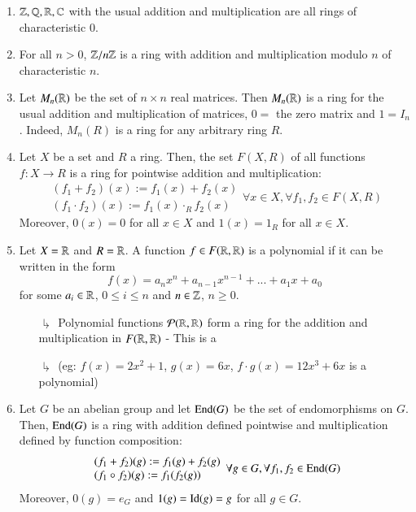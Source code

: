 \documentclass[12pt, a4paper, oneside, openright, titlepage]{book}
\begin{document}
\begin{eg}
    \leavevmode
    \begin{enumerate}
        \item $\mathbb Z, \mathbb Q, \mathbb R, \mathbb C$ with the usual addition and multiplication are all rings of characteristic $0$.
        \item For all $n > 0$, $\mathbb Z/n\mathbb Z$ is a ring with addition and multiplication modulo $n$ of characteristic $n$.
        \item Let $M_n(\mathbb R)$ be the set of $n\times n$ real matrices. Then $M_n(\mathbb R)$ is a ring for the usual addition and multiplication of matrices, $0 = $ the zero matrix and $1 = I_n$. Indeed, $M_n(R)$ is a ring for any arbitrary ring $R$.
        \item Let $X$ be a set and $R$ a ring. Then, the set $F(X,R)$ of all functions $f:X\rightarrow R$ is a ring for pointwise addition and multiplication: \begin{equation}
            \begin{array}{l} (f_1+f_2)(x) := f_1(x)+f_2(x) \\ (f_1\cdot f_2)(x) := f_1(x)\cdot_R f_2(x) \end{array} \forall x \in X, \forall f_1,f_2 \in F(X,R)
        \end{equation}
        Moreover, $0(x) = 0$ for all $x \in X$ and $1(x) = 1_R$ for all $x \in X$.
        \item Let $X = \mathbb R$ and $R = \mathbb R$. A function $f \in F(\mathbb R,\mathbb R)$ is a polynomial if it can be written in the form \begin{equation}
            f(x) = a_nx^n+a_{n-1}x^{n-1}+...+a_1x+a_0
        \end{equation}
        for some $a_i \in \mathbb R$, $0 \leq i \leq n$ and $n \in \mathbb Z$, $n \geq 0$.
        \begin{enumerate}
            \item[$\drsh$] Polynomial functions $\mathcal{P}(\mathbb R,\mathbb R)$ form a ring for the addition and multiplication in $F(\mathbb R,\mathbb R)$ - This is a 
            \item[$\drsh$] (eg: $f(x) = 2x^2+1$, $g(x) = 6x$, $f\cdot g(x) = 12x^3 + 6x$ is a polynomial)
        \end{enumerate}
        \item Let $G$ be an abelian group and let $\operatorname{End}(G)$ be the set of endomorphisms on $G$. Then, $\operatorname{End}(G)$ is a ring with addition defined pointwise and multiplication defined by function composition:
        \begin{equation}
            \begin{array}{l} (f_1+f_2)(g) := f_1(g)+f_2(g) \\ (f_1\circ f_2)(g) := f_1(f_2(g)) \end{array} \forall g \in G, \forall f_1,f_2 \in \operatorname{End}(G)
        \end{equation}
        Moreover, $0(g) = e_G$ and $1(g) = \operatorname{Id}(g) = g$ for all $g \in G$.
    \end{enumerate}
\end{eg}
\end{document}
